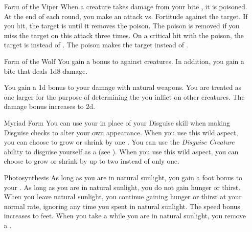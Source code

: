 {\begin{freeability}{Form of the Viper}
                \rankline
                 When a creature takes damage from your bite , it is poisoned.
                At the end of each round, you make an attack vs. Fortitude against the target.
                If you hit, the target is  until it removes the poison.
                The poison is removed if you miss the target on this attack three times.
                 On a critical hit with the poison, the target is  instead of .
                 The poison makes the target  instead of .
            \end{freeability}

            \begin{freeability}{Form of the Wolf}
                You gain a  bonus to  against  creatures.
                In addition, you gain a bite  that deals 1d8 damage.

                \rankline
                 You gain a \plus1d bonus to your damage with natural weapons.
                 You are treated as one  larger for the purpose of determining the  you inflict on other creatures.
                 The damage bonus increases to \plus2d.
            \end{freeability}

            \begin{freeability}{Myriad Form}
                You can use your  in place of your Disguise skill when making Disguise checks to alter your own appearance.
                \rankline
                 When you use this wild aspect, you can choose to grow or shrink by one .
                 You can use the \textit{Disguise Creature} ability to disguise yourself as a  (see ).
                 When you use this wild aspect, you can choose to grow or shrink by up to two  instead of only one.
            \end{freeability}

            \begin{freeability}{Photosynthesis}
                As long as you are in natural sunlight, you gain a  foot bonus to your .
                \rankline
                 As long as you are in natural sunlight, you do not gain hunger or thirst.
                When you leave natural sunlight, you continue gaining hunger or thirst at your normal rate, ignoring any time you spent in natural sunlight.
                 The speed bonus increases to  feet.
                 When you take a  while you are in natural sunlight, you remove a .
            \end{freeability}

}
